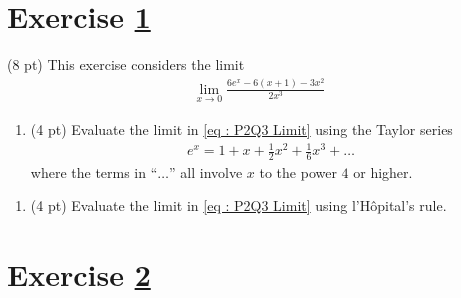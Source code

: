 \spaceSolution{3in}{%
}%





%
%
%
%


\newpage

\section{Exercise \ref{sec : Math112 Spring2022 FinalExam P2Q3}}
\label{sec : Math112 Spring2022 FinalExam P2Q3}

(8 pt) This exercise considers the limit
\begin{align}
\lim_{x \rightarrow 0} \frac{6 e^{x} - 6 (x + 1) - 3 x^{2}}{2 x^{3}}%
\label{eq : P2Q3 Limit}
\end{align}

\begin{enumerate}[label=(\alph*)]
\item\label{itm : Exam4P2Q3a} (4 pt) Evaluate the limit in \eqref{eq : P2Q3 Limit} using the Taylor series
\begin{align*}
e^{x}
=
1 + x + \frac{1}{2} x^{2} + \frac{1}{6} x^{3} + \ldots
\end{align*}
where the terms in ``$\ldots$'' all involve $x$ to the power $4$ or higher.
\end{enumerate}

\spaceSolution{2.75in}{%
}%



\begin{enumerate}[resume,label=(\alph*)]
\item\label{itm : Exam4P2Q3b} (4 pt) Evaluate the limit in \eqref{eq : P2Q3 Limit} using l'H\^{o}pital's rule.
\end{enumerate}

\spaceSolution{2.75in}{%
}%





%
%
%
%


\newpage

\section{Exercise \ref{sec : Math112 Spring2022 FinalExam P2Q4}}
\label{sec : Math112 Spring2022 FinalExam P2Q4}

